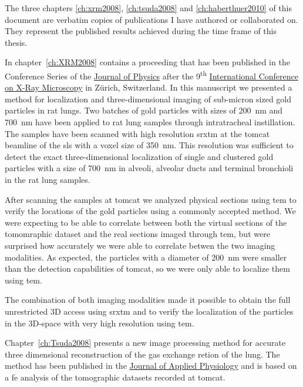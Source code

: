 \label{ch:publications}
The three chapters \ref{ch:xrm2008}, \ref{ch:tsuda2008} and \ref{ch:haberthuer2010} of this document are verbatim copies of publications I have authored or collaborated on. They represent the published results achieved during the time frame of this thesis.

In chapter~\ref{ch:XRM2008} contains a proceeding that has been published in the Conference Series of the \href{http://iopscience.iop.org/1742-6596/}{Journal of Physics} after the 9\textsuperscript{th} \href{http://xrm2008.web.psi.ch/}{International Conference on X-Ray Microscopy} in Zürich, Switzerland. In this manuscript we presented a method for localization and three-dimensional imaging of sub-micron sized gold particles in rat lungs. Two batches of gold particles with sizes of \SI{200}{\nano\meter} and \SI{700}{\nano\meter} have been applied to rat lung samples through intratracheal instillation. The samples have been scanned with high resolution \ac{srxtm} at the \ac{tomcat} beamline of the \ac{sls} with a voxel size of \SI{350}{\nano\meter}. This resolution was sufficient to detect the exact three-dimensional localization of single and clustered gold particles with a size of \SI{700}{\nano\meter} in alveoli, alveolar ducts and terminal bronchioli in the rat lung samples.

After scanning the samples at \ac{tomcat} we analyzed physical sections using \ac{tem} to verify the locations of the gold particles using a commonly accepted method. We were expecting to be able to correlate between both the virtual sections of the tomomraphic dataset and the real sections imaged through \ac{tem}, but were surprised how accurately we were able to correlate betwen the two imaging modalities. As expected, the particles with a diameter of \SI{200}{\nano\meter} were smaller than the detection capabilities of \ac{tomcat}, so we were only able to localize them using \ac{tem}.

The combination of both imaging modalities made it possible to obtain the full
unrestricted 3D access using \ac{srxtm} and to verify the localization of the particles in the 3D-space with very high resolution using \ac{tem}.

Chapter~\ref{ch:Tsuda2008} presents a new image processing method for accurate three dimensional reconstruction of the gas exchange retion of the lung. The method has been  published in the \href{http://jap.physiology.org/}{Journal of Applied Physiology} and is based on a \ac{fe} analysis of the tomographic datasets recorded at \ac{tomcat}. 

